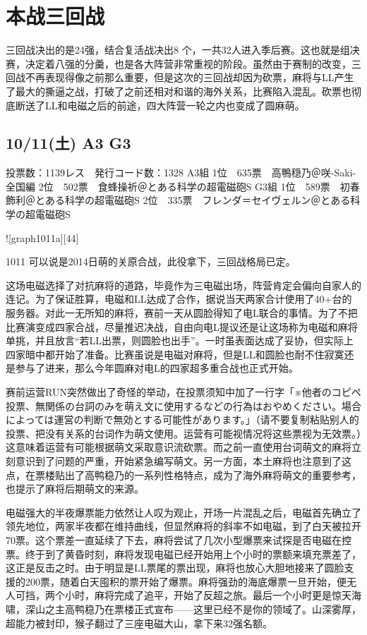 \section{本战三回战}

三回战决出的是24强，结合复活战决出8 个，一共32人进入季后赛。这也就是组决赛，决定着八强的分羹，也是各大阵营非常重视的阶段。虽然由于赛制的改变，三回战不再表现得像之前那么重要，但是这次的三回战却因为砍票，麻将与LL产生了最大的撕逼之战，打破了之前还相对和谐的海外关系，比赛陷入混乱。砍票也彻底断送了LL和电磁之后的前途，四大阵营一轮之内也变成了圆麻萌。

\subsection{10/11(土) A3 G3}

    投票数：1139レス　発行コード数：1328
    A3組
    1位　635票　高鴨穏乃＠咲-Saki- 全国編
    2位　502票　食蜂操祈＠とある科学の超電磁砲S
    G3組
    1位　589票　初春飾利＠とある科学の超電磁砲S
    2位　335票　フレンダ＝セイヴェルン＠とある科学の超電磁砲S

![graph1011a][44]

1011 可以说是2014日萌的关原合战，此役拿下，三回战格局已定。

这场电磁选择了对抗麻将的道路，毕竟作为三电磁出场，阵营肯定会偏向自家人的连记。为了保证胜算，电磁和LL达成了合作，据说当天两家合计使用了40+台的服务器。对此一无所知的麻将，赛前一天从圆脸得知了电L联合的事情。为了不把比赛演变成四家合战，尽量推迟决战，自由向电L提议还是让这场称为电磁和麻将单挑，并且放言“若LL出票，则圆脸也出手”。一时虽表面达成了妥协，但实际上四家暗中都开始了准备。比赛虽说是电磁对麻将，但是LL和圆脸也耐不住寂寞还是参与了进来，那么今年圆麻对电L的四家超多重合战也正式开始。

赛前运营RUN突然做出了奇怪的举动，在投票须知中加了一行字「※他者のコピペ投票、無関係の台詞のみを萌え文に使用するなどの行為はおやめください。場合によっては運営の判断で無効とする可能性があります。」（请不要复制粘贴别人的投票、把没有关系的台词作为萌文使用。运营有可能视情况将这些票视为无效票。）这意味着运营有可能根据萌文采取意识流砍票。而之前一直使用台词萌文的麻将立刻意识到了问题的严重，开始紧急编写萌文。另一方面，本土麻将也注意到了这点，在票楼贴出了高鸭稳乃的一系列性格特点，成为了海外麻将萌文的重要参考，也提示了麻将后期萌文的来源。

电磁强大的半夜爆票能力依然让人叹为观止，开场一片混乱之后，电磁首先确立了领先地位，两家半夜都在维持曲线，但显然麻将的斜率不如电磁，到了白天被拉开70票。这个票差一直延续了下去，麻将尝试了几次小型爆票来试探是否电磁在控票。终于到了黄昏时刻，麻将发现电磁已经开始用上个小时的票额来填充票差了，这正是反击之时。由于明显是LL票尾的票出现，麻将也放心大胆地接来了圆脸支援的200票，随着白天囤积的票开始了爆票。麻将强劲的海底爆票一旦开始，便无人可挡，两个小时，麻将完成了追平，开始了反超之旅。最后一个小时更是惊天海啸，深山之主高鸭稳乃在票楼正式宣布——这里已经不是你的领域了。山深雾厚，超能力被封印，猴子翻过了三座电磁大山，拿下来32强名额。

